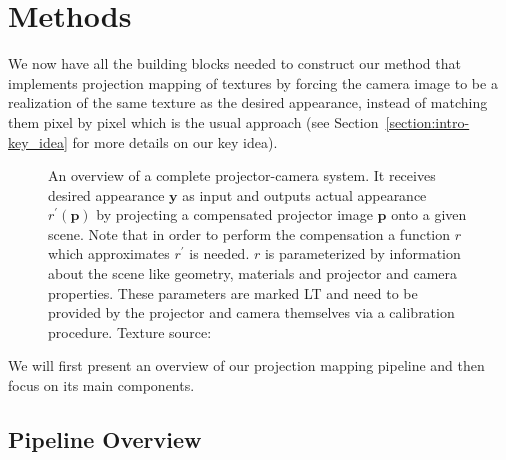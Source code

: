 \chapter{Methods}
\label{chapter:methods}

We now have all the building blocks needed to construct our method that implements projection mapping of textures by forcing the camera image to be a realization of the same texture as the desired appearance, instead of matching them pixel by pixel which is the usual approach (see Section~\ref{section:intro-key_idea} for more details on our key idea).

\begin{figure}[t]
    \centering
    \def\svgwidth{0.8\textwidth}
    
    \caption{An overview of a complete projector-camera system. It receives desired appearance \(\bm{y}\) as input and outputs actual appearance \(r^\prime(\bm{p})\) by projecting a compensated projector image \(\bm{p}\) onto a given scene. Note that in order to perform the compensation a function \(r\) which approximates \(r^\prime\) is needed. \(r\) is parameterized by information about the scene like geometry, materials and projector and camera properties. These parameters are marked LT and need to be provided by the projector and camera themselves via a calibration procedure. Texture source: \citet{Pixar128}}
    \label{fig:methods_system}
\end{figure}

We will first present an overview of our projection mapping pipeline and then focus on its main components.

\section{Pipeline Overview}
\label{section:methods-pipeline_overview}

